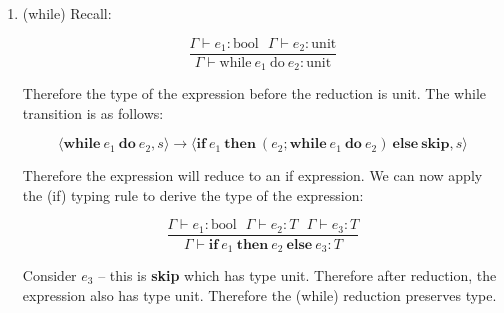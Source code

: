 \documentclass[10pt,\jkfside,a4paper]{article}
\begin{document}
\begin{enumerate}
\begin{enumerate}[label=\textbf{Case}]
\item (while) Recall:

\[
\dfrac{
\Gamma \vdash e_1: \text{bool} \ \ \ \Gamma \vdash e_2: \text{unit}
}{
\Gamma \vdash \text{while} \ e_1 \ \text{do} \ e_2: \text{unit}
}
\]

Therefore the type of the expression before the reduction is unit. The while
transition is as follows:

\[
\langle \textbf{while} \ e_1 \ \textbf{do} \ e_2, s \rangle \to
\langle \textbf{if} \ e_1 \ \textbf{then} \ (e_2; \textbf{while} \ e_1 \
\textbf{do} \ e_2) \ \textbf{else} \ \textbf{skip}, s \rangle
\]

Therefore the expression will reduce to an if expression. We can now apply
the (if) typing rule to derive the type of the expression:

\[
\dfrac{
\Gamma \vdash e_1: \text{bool} \ \ \ \Gamma \vdash e_2:T \ \ \ \Gamma \vdash
 e_3: T
}{
\Gamma \vdash \textbf{if} \ e_1 \ \textbf{then} \ e_2 \ \textbf{else} \ e_3: T
}
\]

Consider $e_3$ -- this is \textbf{skip} which has type unit. Therefore after
reduction, the expression also has type unit. Therefore the (while)
reduction preserves type.

\end{enumerate}

\end{enumerate}
\end{document}
